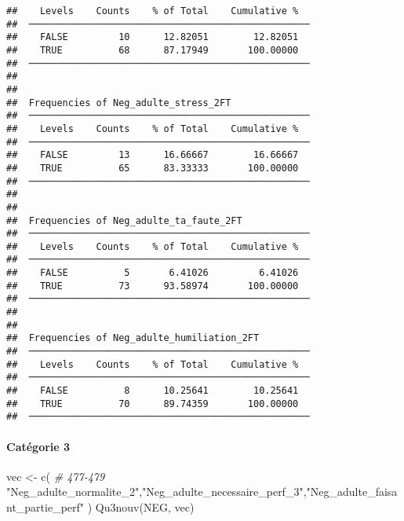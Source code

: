 \documentclass[
]{article}
\newenvironment{Shaded}{\begin{snugshade}}{\end{snugshade}}
\newcommand{\CommentTok}[1]{\textcolor[rgb]{0.56,0.35,0.01}{\textit{#1}}}
\newcommand{\FunctionTok}[1]{\textcolor[rgb]{0.00,0.00,0.00}{#1}}
\newcommand{\NormalTok}[1]{#1}
\newcommand{\OtherTok}[1]{\textcolor[rgb]{0.56,0.35,0.01}{#1}}
\newcommand{\StringTok}[1]{\textcolor[rgb]{0.31,0.60,0.02}{#1}}
\begin{document}
\begin{verbatim}
##    Levels    Counts    % of Total    Cumulative %   
##  ────────────────────────────────────────────────── 
##    FALSE         10      12.82051        12.82051   
##    TRUE          68      87.17949       100.00000   
##  ────────────────────────────────────────────────── 
## 
## 
##  Frequencies of Neg_adulte_stress_2FT               
##  ────────────────────────────────────────────────── 
##    Levels    Counts    % of Total    Cumulative %   
##  ────────────────────────────────────────────────── 
##    FALSE         13      16.66667        16.66667   
##    TRUE          65      83.33333       100.00000   
##  ────────────────────────────────────────────────── 
## 
## 
##  Frequencies of Neg_adulte_ta_faute_2FT             
##  ────────────────────────────────────────────────── 
##    Levels    Counts    % of Total    Cumulative %   
##  ────────────────────────────────────────────────── 
##    FALSE          5       6.41026         6.41026   
##    TRUE          73      93.58974       100.00000   
##  ────────────────────────────────────────────────── 
## 
## 
##  Frequencies of Neg_adulte_humiliation_2FT          
##  ────────────────────────────────────────────────── 
##    Levels    Counts    % of Total    Cumulative %   
##  ────────────────────────────────────────────────── 
##    FALSE          8      10.25641        10.25641   
##    TRUE          70      89.74359       100.00000   
##  ──────────────────────────────────────────────────
\end{verbatim}

\hypertarget{catuxe9gorie-3-5}{%
\paragraph{Catégorie 3}\label{catuxe9gorie-3-5}}

\begin{Shaded}
\begin{Highlighting}[]
\NormalTok{vec }\OtherTok{\textless{}{-}} \FunctionTok{c}\NormalTok{(  }\CommentTok{\# 477{-}479}
  \StringTok{"Neg\_adulte\_normalite\_2"}\NormalTok{,}\StringTok{"Neg\_adulte\_necessaire\_perf\_3"}\NormalTok{,}\StringTok{"Neg\_adulte\_faisant\_partie\_perf"}
\NormalTok{)}
\FunctionTok{Qu3nouv}\NormalTok{(NEG, vec)}
\end{Highlighting}
\end{Shaded}
\end{document}
